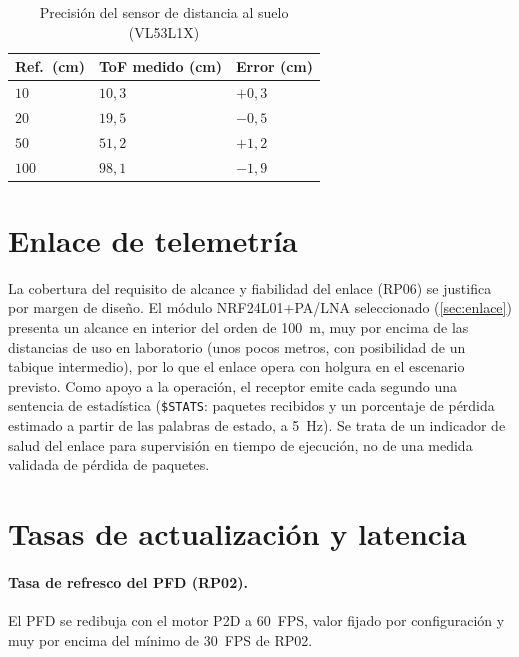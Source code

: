 \begin{table}[H]
    \centering
    \caption{Precisión del sensor de distancia al suelo (VL53L1X)}
    \label{tab:val_distancia}
    \footnotesize
    \begin{tabularx}{\linewidth}{C{4.0cm} C{4.0cm} C{4.0cm}}
        \toprule
        \textbf{Ref.\ (\si{\centi\meter})} & \textbf{ToF medido (\si{\centi\meter})} & \textbf{Error (\si{\centi\meter})} \\
        \midrule
        $10$  & $10{,}3$ & $+0{,}3$ \\
        $20$  & $19{,}5$ & $-0{,}5$ \\
        $50$  & $51{,}2$ & $+1{,}2$ \\
        $100$ & $98{,}1$ & $-1{,}9$ \\
        \bottomrule
    \end{tabularx}
\end{table}


\section{Enlace de telemetría}
\label{sec:val_enlace}

La cobertura del requisito de alcance y fiabilidad del enlace (RP06) se justifica
por margen de diseño. El módulo NRF24L01+PA/LNA seleccionado (\cref{sec:enlace})
presenta un alcance en interior del orden de \SI{100}{\meter}, muy por encima de
las distancias de uso en laboratorio (unos pocos metros, con posibilidad de un
tabique intermedio), por lo que el enlace opera con holgura en el escenario
previsto. Como apoyo a la operación, el receptor emite cada segundo una sentencia
de estadística (\texttt{\$STATS}: paquetes recibidos y un porcentaje de pérdida
estimado a partir de las palabras de estado, a \SI{5}{\hertz}). Se trata de un
indicador de salud del enlace para supervisión en tiempo de ejecución, no de una
medida validada de pérdida de paquetes.


\section{Tasas de actualización y latencia}
\label{sec:val_latencia}

\paragraph{Tasa de refresco del PFD (RP02).}
El PFD se redibuja con el motor P2D a \SI{60}{FPS}, valor fijado por configuración
y muy por encima del mínimo de \SI{30}{FPS} de RP02.

